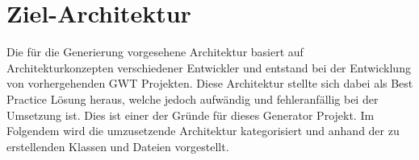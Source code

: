 \section{Ziel-Architektur}\label{AufBZielArchitektur}
Die für die Generierung vorgesehene Architektur basiert auf 
Architekturkonzepten verschiedener Entwickler und entstand bei der Entwicklung
von vorhergehenden GWT Projekten. Diese Architektur stellte sich dabei als
\glqq{}Best Practice\grqq{} Lösung heraus, welche jedoch aufwändig und
fehleranfällig bei der Umsetzung ist. Dies ist einer der Gründe für dieses Generator Projekt.
Im Folgendem wird die umzusetzende Architektur kategorisiert und anhand der zu
erstellenden Klassen und Dateien vorgestellt.

